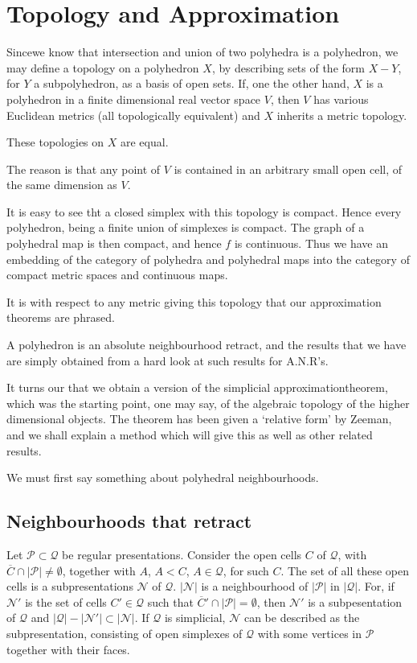 
\chapter{Topology and Approximation}\label{chap3}

Since\pageoriginale we know that intersection and union of two polyhedra is a polyhedron, we may define a topology on a polyhedron $X$, by describing sets of the form $X-Y$, for $Y$ a subpolyhedron, as a basis of open sets. If, one the other hand, $X$ is a polyhedron in a finite dimensional real vector space $V$, then $V$ has various Euclidean metrics (all topologically equivalent) and $X$ inherits a metric topology. 

\begin{ex*}
These topologies on $X$ are equal.
\end{ex*}

The reason is that any point of $V$ is contained in an arbitrary small open cell, of the same dimension as $V$.

It is easy to see tht a closed simplex with this topology is compact. Hence every polyhedron, being a finite union of simplexes is compact. The graph of a polyhedral map is then compact, and hence $f$ is continuous. Thus we have an embedding of the category of polyhedra and polyhedral maps into the category of compact metric spaces and continuous maps.

It is with respect to any metric giving this topology that our approximation theorems are phrased.

A polyhedron is an absolute neighbourhood retract, and the results that we have are simply obtained from a hard look at such results for A.N.R's.

It turns our that we obtain a version of the simplicial approximation\pageoriginale theorem, which was the starting point, one may say, of the algebraic topology of the higher dimensional objects. The theorem has been given a `relative form' by Zeeman, and we shall explain a method which will give this as well as other related results.

We must first say something about polyhedral neighbourhoods.

\section{Neighbourhoods that retract}\label{chap3-sec3.1}

Let $\mathscr{P}\subset \mathcal{Q}$ be regular presentations. Consider the open cells $C$ of $\mathcal{Q}$, with $\overline{C}\cap |\mathscr{P}|\neq \emptyset$, together with $A$, $A<C$, $A\in \mathcal{Q}$, for such $C$. The set of all these open cells is a subpresentations $\mathscr{N}$ of $\mathcal{Q}$. $|\mathscr{N}|$ is a neighbourhood of $|\mathscr{P}|$ in $|\mathcal{Q}|$. For, if $\mathscr{N}'$ is the set of cells $C'\in \mathcal{Q}$ such that $\overline{C}'\cap |\mathscr{P}|=\emptyset$, then $\mathscr{N}'$ is a subpesentation of $\mathcal{Q}$ and $|\mathcal{Q}|-|\mathscr{N}'|\subset |\mathscr{N}|$. If $\mathcal{Q}$ is simplicial, $\mathscr{N}$ can be described as the subpresentation, consisting of open simplexes of $\mathcal{Q}$ with some vertices in $\mathscr{P}$ together with their faces. 

